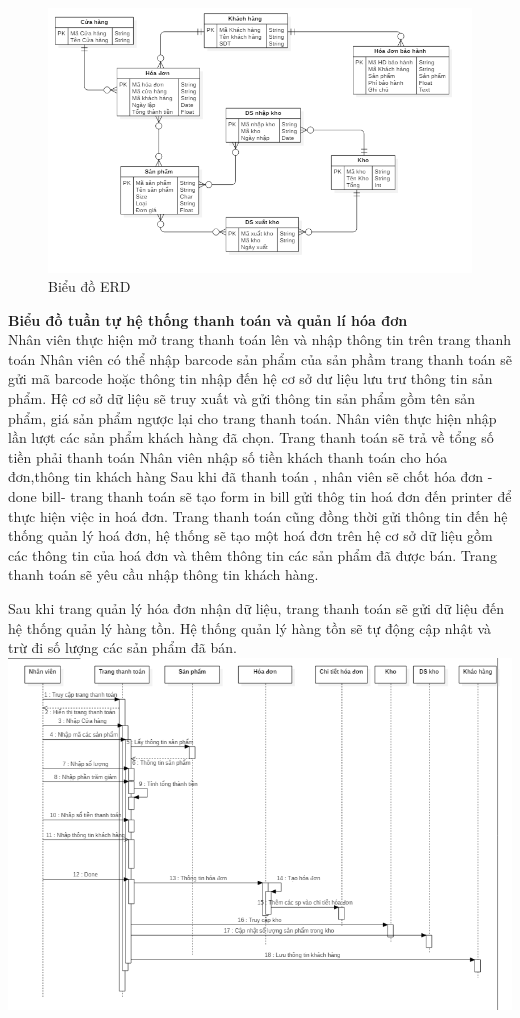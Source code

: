 \documentclass{article}
\begin{document}
\begin{figure}
    \centering
    \includegraphics{16.png}
    \caption{Biểu đồ ERD}
\end{figure}
\pagebreak
\fontsize{14}{20}\selectfont\textbf{Biểu đồ tuần tự hệ thống thanh toán và quản lí hóa đơn\\}
\fontsize{13}{20}\selectfont
Nhân viên thực hiện mở trang thanh toán lên và nhập thông tin trên trang thanh toán Nhân viên có thể nhập barcode sản phẩm của sản phầm trang thanh toán sẽ gửi mã barcode hoặc thông tin nhập đến hệ cơ sở dư liệu lưu trư thông tin sản phẩm. Hệ cơ sở dữ liệu sẽ truy xuất và gửi thông tin sản phẩm gồm tên sản phẩm, giá sản phẩm ngược lại cho trang thanh toán. Nhân viên thực hiện nhập lần lượt các sản phẩm khách hàng đã chọn. Trang thanh toán sẽ trả về tổng số tiền phải thanh toán Nhân viên nhập số tiền khách thanh toán cho hóa đơn,thông tin khách hàng Sau khi đã thanh toán ,  nhân viên sẽ chốt hóa đơn -done bill- trang thanh toán sẽ tạo form in bill gửi thôg tin hoá đơn đến printer để thực hiện việc in hoá đơn. Trang thanh toán cũng đồng thời gửi thông tin đến hệ thống quản lý hoá đơn, hệ thống sẽ tạo một hoá đơn trên hệ cơ sở dữ liệu gồm các thông tin của hoá đơn và thêm thông tin các sản phẩm đã được bán. Trang thanh toán sẽ yêu cầu nhập thông tin khách hàng. 

Sau khi trang quản lý hóa đơn nhận dữ liệu, trang thanh toán sẽ gửi dữ liệu đến hệ thống quản lý hàng tồn. Hệ thống quản lý hàng tồn sẽ tự động cập nhật và trừ đi số lượng các sản phẩm đã bán.\\
\includegraphics[scale = 0.8]{8.png}
\end{document}
